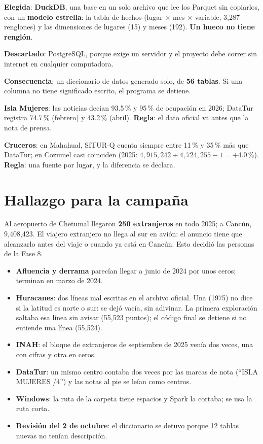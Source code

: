 \begin{opciones}
\textbf{Elegida}: \textbf{DuckDB}, una base en un solo archivo que lee los Parquet sin copiarlos, con un \textbf{modelo
estrella}: la tabla de hechos (lugar $\times$ mes $\times$ variable, 3,287 renglones) y las dimensiones de lugares (15) y
meses (192). \textbf{Un hueco no tiene renglón}.

\textbf{Descartado}: PostgreSQL, porque exige un servidor y el proyecto debe correr sin internet en cualquier computadora.

\textbf{Consecuencia}: un diccionario de datos generado solo, de \textbf{56 tablas}. Si una columna no tiene significado
escrito, el programa se detiene.
\end{opciones}

\begin{opciones}
\textbf{Isla Mujeres}: las noticias decían 93.5\,\% y 95\,\% de ocupación en 2026; DataTur registra 74.7\,\% (febrero) y
43.2\,\% (abril). \textbf{Regla}: el dato oficial va antes que la nota de prensa.

\textbf{Cruceros}: en Mahahual, SITUR-Q cuenta siempre entre 11\,\% y 35\,\% más que DataTur; en Cozumel casi coinciden
(2025: $4{,}915{,}242\div4{,}724{,}255-1=+4.0\,\%$). \textbf{Regla}: una fuente por lugar, y la diferencia se declara.
\end{opciones}

\section*{Hallazgo para la campaña}
Al aeropuerto de Chetumal llegaron \textbf{250 extranjeros} en todo 2025; a Cancún, 9,408,423. El viajero extranjero no llega
al sur en avión: el anuncio tiene que alcanzarlo antes del viaje o cuando ya está en Cancún. Esto decidió las personas de la
Fase 8.

\begin{error}
\begin{itemize}
\item \textbf{Afluencia y derrama} parecían llegar a junio de 2024 por unos ceros; terminan en marzo de 2024.
\item \textbf{Huracanes}: dos líneas mal escritas en el archivo oficial. Una (1975) no dice si la latitud es norte o sur: se
  dejó vacía, sin adivinar. La primera exploración saltaba esa línea sin avisar (55,523 puntos); el código final se detiene
  si no entiende una línea (55,524).
\item \textbf{INAH}: el bloque de extranjeros de septiembre de 2025 venía dos veces, una con cifras y otra en ceros.
\item \textbf{DataTur}: un mismo centro contaba dos veces por las marcas de nota (``ISLA MUJERES /4'') y las notas al pie se
  leían como centros.
\item \textbf{Windows}: la ruta de la carpeta tiene espacios y Spark la cortaba; se usa la ruta corta.
\item \textbf{Revisión del 2 de octubre}: el diccionario se detuvo porque 12 tablas nuevas no tenían descripción.
\end{itemize}
\end{error}
